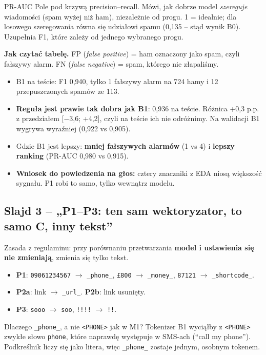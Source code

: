 \documentclass[11pt,a4paper]{article}
\begin{document}
\begin{pojecie}{PR-AUC}
Pole pod krzywą precision--recall. Mówi, jak dobrze model \emph{szereguje} wiadomości (spam wyżej niż ham), niezależnie
od progu. 1 = idealnie; dla losowego szeregowania równa się udziałowi spamu (0,135 -- stąd wynik B0).
Uzupełnia F1, które zależy od jednego wybranego progu.
\end{pojecie}

\textbf{Jak czytać tabelę.} FP (\emph{false positive}) = ham oznaczony jako spam, czyli fałszywy alarm.
FN (\emph{false negative}) = spam, którego nie złapaliśmy.

\begin{itemize}
  \item B1 na teście: F1 0,940, tylko 1 fałszywy alarm na 724 hamy i 12 przepuszczonych spamów ze 113.
  \item \textbf{Reguła jest prawie tak dobra jak B1}: 0,936 na teście. Różnica +0,3 p.p. z przedziałem [$-$3,6; +4,2],
        czyli na teście ich nie odróżnimy. Na walidacji B1 wygrywa wyraźniej (0,922 vs 0,905).
  \item Gdzie B1 jest lepszy: \textbf{mniej fałszywych alarmów} (1 vs 4) i \textbf{lepszy ranking} (PR-AUC 0,980 vs 0,915).
  \item \textbf{Wniosek do powiedzenia na głos:} cztery znaczniki z EDA niosą większość sygnału. P1 robi to samo, tylko
        wewnątrz modelu.
\end{itemize}

\subsection{Slajd 3 -- „P1--P3: ten sam wektoryzator, to samo C, inny tekst”}

Zasada z regulaminu: przy porównaniu przetwarzania \textbf{model i ustawienia się nie zmieniają}, zmienia się tylko tekst.

\begin{itemize}
  \item \textbf{P1}: \texttt{09061234567} $\to$ \texttt{\_phone\_}, \texttt{£800} $\to$ \texttt{\_money\_},
        \texttt{87121} $\to$ \texttt{\_shortcode\_}.
  \item \textbf{P2a}: link $\to$ \texttt{\_url\_}. \textbf{P2b}: link usunięty.
  \item \textbf{P3}: \texttt{sooo} $\to$ \texttt{soo}, \texttt{!!!!} $\to$ \texttt{!!}.
\end{itemize}

\begin{pojecie}{Dlaczego \texttt{\_phone\_}, a nie \texttt{<PHONE>} jak w M1?}
Tokenizer B1 wyciąłby z \texttt{<PHONE>} zwykłe słowo \texttt{phone}, które naprawdę występuje w SMS-ach (``call my phone'').
Podkreślnik liczy się jako litera, więc \texttt{\_phone\_} zostaje jednym, osobnym tokenem.
\end{pojecie}
\end{document}
